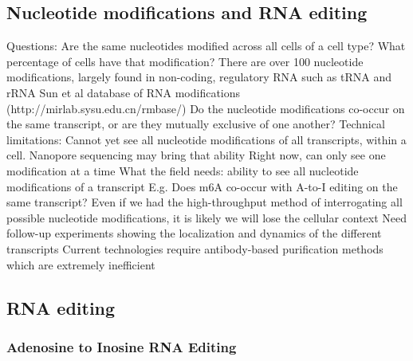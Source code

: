 \subsection{Nucleotide modifications and RNA editing}
Questions:
Are the same nucleotides modified across all cells of a cell type?
What percentage of cells have that modification?
There are over 100 nucleotide modifications, largely found in non-coding, regulatory RNA such as tRNA and rRNA \cite{Ferre-DAmare2003-to,Ishitani2008-rf,Sun2016-rk}
Sun et al database of RNA modifications (http://mirlab.sysu.edu.cn/rmbase/)
Do the nucleotide modifications co-occur on the same transcript, or are they mutually exclusive of one another?
Technical limitations:
Cannot yet see all nucleotide modifications of all transcripts, within a cell.
Nanopore sequencing may bring that ability
Right now, can only see one modification at a time
What the field needs: ability to see all nucleotide modifications of a transcript
E.g. Does m6A co-occur with A-to-I editing on the same transcript?
Even if we had the high-throughput method of interrogating all possible nucleotide modifications, it is likely we will lose the cellular context
Need follow-up experiments showing the localization and dynamics of the different transcripts
Current technologies require antibody-based purification methods which are extremely inefficient


\subsection{RNA editing}

\subsubsection{Adenosine to Inosine RNA Editing}


